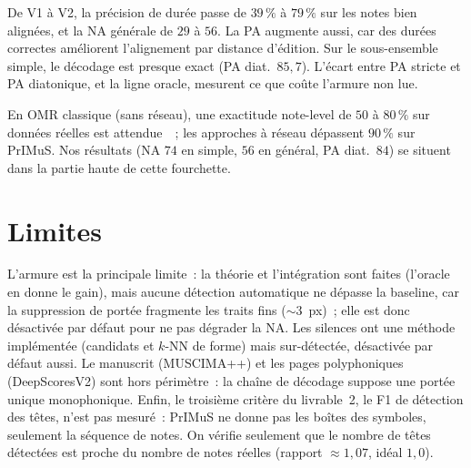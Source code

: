 \documentclass[11pt,a4paper]{article}
\begin{document}
De V1 à V2, la précision de durée passe de $39\,\%$ à $79\,\%$ sur les notes bien alignées, et la NA générale de
$29$ à $56$. La PA augmente aussi, car des durées correctes améliorent l'alignement par distance d'édition. Sur
le sous-ensemble simple, le décodage est presque exact (PA diat.\ $85{,}7$). L'écart entre PA stricte et PA
diatonique, et la ligne oracle, mesurent ce que coûte l'armure non lue.

En OMR classique (sans réseau), une exactitude note-level de $50$ à $80\,\%$ sur données réelles est
attendue~\cite{rebelo2012,calvo2020}~; les approches à réseau dépassent $90\,\%$ sur PrIMuS. Nos résultats (NA
$74$ en simple, $56$ en général, PA diat.\ $84$) se situent dans la partie haute de cette fourchette.

\section{Limites}\label{sec:limites}
L'armure est la principale limite~: la théorie et l'intégration sont faites (l'oracle en donne
le gain), mais aucune détection automatique ne dépasse la baseline, car la suppression de portée fragmente les
traits fins ($\sim$3~px)~; elle est donc désactivée par défaut pour ne pas dégrader la NA. Les silences ont une
méthode implémentée (candidats et $k$-NN de forme) mais sur-détectée, désactivée par défaut aussi. Le manuscrit
(MUSCIMA++) et les pages polyphoniques (DeepScoresV2) sont hors périmètre~: la chaîne de décodage suppose une
portée unique monophonique. Enfin, le troisième critère du livrable~2, le F1 de détection des têtes, n'est pas
mesuré~: PrIMuS ne donne pas les boîtes des symboles, seulement la séquence de notes. On vérifie seulement que
le nombre de têtes détectées est proche du nombre de notes réelles (rapport $\approx 1{,}07$, idéal $1{,}0$).

\printbibliography[heading=bibnumbered,title={Références}]
\end{document}
